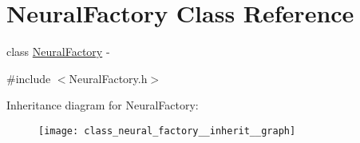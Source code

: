 \hypertarget{class_neural_factory}{
\section{NeuralFactory Class Reference}
\label{class_neural_factory}
}


class \hyperlink{class_neural_factory}{NeuralFactory} -\/  




{\ttfamily \#include $<$NeuralFactory.h$>$}



Inheritance diagram for NeuralFactory:
\nopagebreak
\begin{figure}[H]
\begin{center}
\leavevmode
\texttt{[image: class\_neural\_factory\_\_inherit\_\_graph]}
\end{center}
\end{figure}
